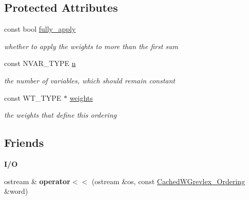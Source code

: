\subsection*{Protected Attributes}
\begin{DoxyCompactItemize}
\item 
\mbox{\label{class_cached_w_grevlex___ordering_a1673ac75841fe8203941c73030621579}} 
const bool \hyperlink{class_cached_w_grevlex___ordering_a1673ac75841fe8203941c73030621579}{fully\+\_\+apply}
\begin{DoxyCompactList}\small\item\em whether to apply the weights to more than the first sum \end{DoxyCompactList}\item 
\mbox{\label{class_cached_w_grevlex___ordering_a2857c72d3d83c1ec4dfaea5dc6fb4893}} 
const N\+V\+A\+R\+\_\+\+T\+Y\+PE \hyperlink{class_cached_w_grevlex___ordering_a2857c72d3d83c1ec4dfaea5dc6fb4893}{n}
\begin{DoxyCompactList}\small\item\em the number of variables, which should remain constant \end{DoxyCompactList}\item 
\mbox{\label{class_cached_w_grevlex___ordering_adb595ee1755d11ab65164222c7ec2d94}} 
const W\+T\+\_\+\+T\+Y\+PE $\ast$ \hyperlink{class_cached_w_grevlex___ordering_adb595ee1755d11ab65164222c7ec2d94}{weights}
\begin{DoxyCompactList}\small\item\em the weights that define this ordering \end{DoxyCompactList}\end{DoxyCompactItemize}
\subsection*{Friends}
\begin{Indent}\textbf{ I/O}\par
\begin{DoxyCompactItemize}
\item 
\mbox{\label{class_cached_w_grevlex___ordering_a6b25de5d93b628d0cb77ec4caafca32b}} 
ostream \& {\bfseries operator$<$$<$} (ostream \&os, const \hyperlink{class_cached_w_grevlex___ordering}{Cached\+W\+Grevlex\+\_\+\+Ordering} \&word)
\end{DoxyCompactItemize}
\end{Indent}



